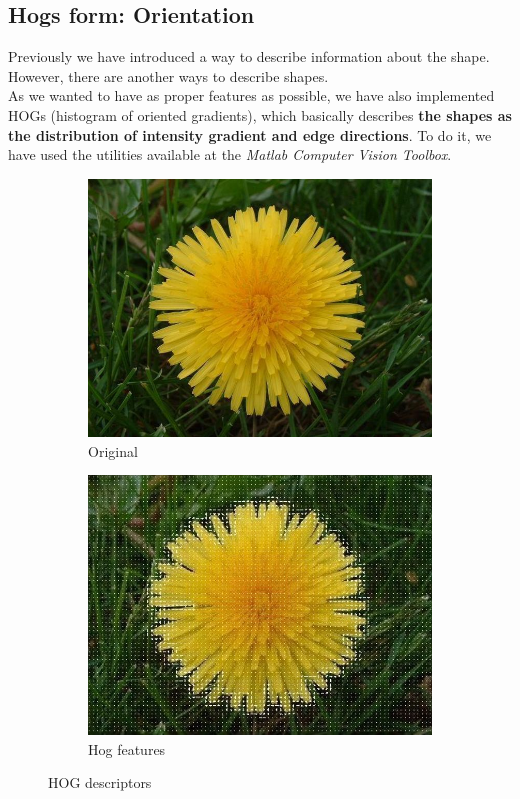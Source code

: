\documentclass[11]{article}
\begin{document}
\subsection{Hogs form: Orientation}
Previously we have introduced a way to describe information about the shape. However, there are another ways to describe shapes. 
\\
As we wanted to have as proper features as possible, we have also implemented HOGs (histogram of oriented gradients), which basically describes \textbf{the shapes as the distribution of intensity gradient and edge directions}. To do it, we have used the utilities available at the \textit{Matlab Computer Vision Toolbox}.

\begin{figure}[H]
    \begin{subfigure}[t]{0.45\textwidth}
    \centering
  \includegraphics[scale=0.234]{images/originalhogg.jpg}
    \caption{Original}
    \label{originalhogg}
    \end{subfigure}
    \begin{subfigure}[t]{0.45\textwidth}
    \centering
    \includegraphics[scale=0.345]{images/hogg.jpg}
    \caption{Hog features}
    \label{hogg2}
    \end{subfigure}
    \label{hogg}
    \caption{HOG descriptors}
\end{figure}
\end{document}
